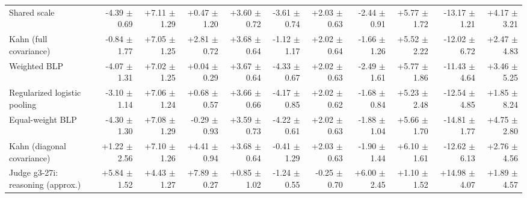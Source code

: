 \begin{tabular}{lrrrrrrrrrr}
Shared scale & -4.39 {\scriptsize $\pm$ 0.69} & +7.11 {\scriptsize $\pm$ 1.29} & +0.47 {\scriptsize $\pm$ 1.20} & +3.60 {\scriptsize $\pm$ 0.72} & -3.61 {\scriptsize $\pm$ 0.74} & +2.03 {\scriptsize $\pm$ 0.63} & -2.44 {\scriptsize $\pm$ 0.91} & +5.77 {\scriptsize $\pm$ 1.72} & -13.17 {\scriptsize $\pm$ 1.21} & +4.17 {\scriptsize $\pm$ 3.21} \\
Kahn (full covariance) & -0.84 {\scriptsize $\pm$ 1.77} & +7.05 {\scriptsize $\pm$ 1.25} & +2.81 {\scriptsize $\pm$ 0.72} & +3.68 {\scriptsize $\pm$ 0.64} & -1.12 {\scriptsize $\pm$ 1.17} & +2.02 {\scriptsize $\pm$ 0.64} & -1.66 {\scriptsize $\pm$ 1.26} & +5.52 {\scriptsize $\pm$ 2.22} & -12.02 {\scriptsize $\pm$ 6.72} & +2.47 {\scriptsize $\pm$ 4.83} \\
Weighted BLP & -4.07 {\scriptsize $\pm$ 1.31} & +7.02 {\scriptsize $\pm$ 1.25} & +0.04 {\scriptsize $\pm$ 0.29} & +3.67 {\scriptsize $\pm$ 0.64} & -4.33 {\scriptsize $\pm$ 0.67} & +2.02 {\scriptsize $\pm$ 0.63} & -2.49 {\scriptsize $\pm$ 1.61} & +5.77 {\scriptsize $\pm$ 1.86} & -11.43 {\scriptsize $\pm$ 4.64} & +3.46 {\scriptsize $\pm$ 5.25} \\
Regularized logistic pooling & -3.10 {\scriptsize $\pm$ 1.14} & +7.06 {\scriptsize $\pm$ 1.24} & +0.68 {\scriptsize $\pm$ 0.57} & +3.66 {\scriptsize $\pm$ 0.66} & -4.17 {\scriptsize $\pm$ 0.85} & +2.02 {\scriptsize $\pm$ 0.62} & -1.68 {\scriptsize $\pm$ 0.84} & +5.23 {\scriptsize $\pm$ 2.48} & -12.54 {\scriptsize $\pm$ 4.85} & +1.85 {\scriptsize $\pm$ 8.24} \\
Equal-weight BLP & -4.30 {\scriptsize $\pm$ 1.30} & +7.08 {\scriptsize $\pm$ 1.29} & -0.29 {\scriptsize $\pm$ 0.93} & +3.59 {\scriptsize $\pm$ 0.73} & -4.22 {\scriptsize $\pm$ 0.61} & +2.02 {\scriptsize $\pm$ 0.63} & -1.88 {\scriptsize $\pm$ 1.04} & +5.66 {\scriptsize $\pm$ 1.70} & -14.81 {\scriptsize $\pm$ 1.77} & +4.75 {\scriptsize $\pm$ 2.80} \\
Kahn (diagonal covariance) & +1.22 {\scriptsize $\pm$ 2.56} & +7.10 {\scriptsize $\pm$ 1.26} & +4.41 {\scriptsize $\pm$ 0.94} & +3.68 {\scriptsize $\pm$ 0.64} & -0.41 {\scriptsize $\pm$ 1.29} & +2.03 {\scriptsize $\pm$ 0.63} & -1.90 {\scriptsize $\pm$ 1.44} & +6.10 {\scriptsize $\pm$ 1.61} & -12.62 {\scriptsize $\pm$ 6.13} & +2.76 {\scriptsize $\pm$ 4.56} \\
Judge g3-27i: reasoning (approx.) & +5.84 {\scriptsize $\pm$ 1.52} & +4.43 {\scriptsize $\pm$ 1.27} & +7.89 {\scriptsize $\pm$ 0.27} & +0.85 {\scriptsize $\pm$ 1.02} & -1.24 {\scriptsize $\pm$ 0.55} & -0.25 {\scriptsize $\pm$ 0.70} & +6.00 {\scriptsize $\pm$ 2.45} & +1.10 {\scriptsize $\pm$ 1.52} & +14.98 {\scriptsize $\pm$ 4.07} & +1.89 {\scriptsize $\pm$ 4.57} \\

\end{tabular}
